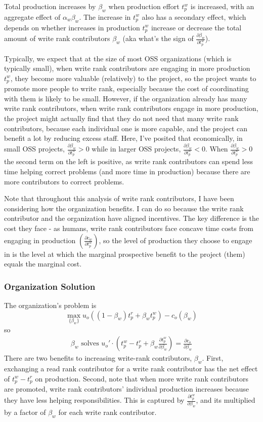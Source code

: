 \documentclass[source/paper/main.tex]{subfiles}
\begin{document}
Total production increases by $\beta_w$ when production effort $t_p^w$ is increased, with an aggregate effect of $\alpha_w\beta_w$. The increase in $t_p^w$ also has a secondary effect, which depends on whether increases in production $t_p^w$ increase or decrease the total amount of write rank contributors $\beta_w$ (aka what's the sign of $\frac{\partial \beta_w}{\partial t_p^w}$). 

Typically, we expect that at the size of most OSS organizations (which is typically small), when write rank contributors are engaging in more production $t_p^w$, they become more valuable (relatively) to the project, so the project wants to promote more people to write rank, especially because the cost of coordinating with them is likely to be small. However, if the organization already has many write rank contributors, when write rank contributors engage in more production, the project might actually find that they do not need that many write rank contributors, because each individual one is more capable, and the project can benefit a lot by reducing excess staff. Here, I've posited that economically, in small OSS projects, $\frac{\partial \beta_w}{\partial t_p^w}>0$ while in larger OSS projects, $\frac{\partial \beta_w}{\partial t_p^w}<0$. When $\frac{\partial \beta_w}{\partial t_p^w}>0$ the second term on the left is positive, as write rank contributors can spend less time helping correct problems (and more time in production) because there are more contributors to correct problems. 

Note that throughout this analysis of write rank contributors, I have been considering how the organization benefits. I can do so because the write rank contributor and the organization have aligned incentives. The key difference is the cost they face - as humans, write rank contributors face concave time costs from engaging in production $(\frac{\partial c_w}{\partial t_p^w})$, so the level of production they choose to engage in is the level at which the marginal prospective benefit to the project (them) equals the marginal cost.  

\subsubsection{Organization Solution}
The organization's problem is 
$$\max_{\{\beta_w\}} u_o\left((1-\beta_w) t_p^r + \beta_w t_p^w\right) - c_o(\beta_w)$$ 
so 
\begin{align}
    \beta_w \text{ solves } u_o' \cdot (t_p^w- t_p^r + \beta_w \frac{\partial t_p^w}{\partial \beta_w} ) = \frac{\partial c_o}{\partial \beta_w} \label{org_solution}
\end{align}
There are two benefits to increasing write-rank contributors, $\beta_w$. First, exchanging a read rank contributor for a write rank contributor has the net effect of $t_p^w - t_p^r$ on production. Second, note that when more write rank contributors are promoted, write rank contributors' individual production increases because they have less helping responsibilities. This is captured by $\frac{\partial t_p^w}{\partial \beta_w}$, and its multiplied by a factor of $\beta_w$ for each write rank contributor. 
\end{document}
